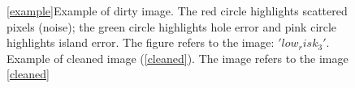 \documentclass[a4paper,12pt,oneside,titlepage]{article}
\begin{document}
	\begin{figure}[ht]
		\centering
		\hspace{2cm}
		
		\caption{\ref{example}Example of dirty image. The red circle highlights scattered pixels (noise); the green circle highlights hole error and pink circle highlights island error. The figure refers to the image: $'low_risk_3'$. Example of cleaned image (\ref{cleaned}). The image refers to the image \ref{cleaned} }
		
		
	\end{figure}
	
\end{document}
